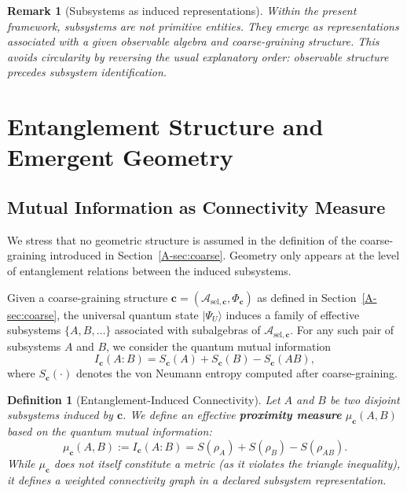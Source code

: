\documentclass[12pt,a4paper,openany]{book}
\newtheorem{definition}[theorem]{Definition}
\newtheorem{remark}[theorem]{Remark}
\begin{document}
\begin{remark}[Subsystems as induced representations]
Within the present framework, subsystems are not primitive entities. 
They emerge as representations associated with a given observable algebra and coarse-graining structure. 
This avoids circularity by reversing the usual explanatory order: observable structure precedes subsystem identification.
\end{remark}

\section{Entanglement Structure and Emergent Geometry}
\label{A-sec:geometry}

\subsection{Mutual Information as Connectivity Measure}

We stress that no geometric structure is assumed in the definition of the coarse-graining introduced in Section~\ref{A-sec:coarse}. 
Geometry only appears at the level of entanglement relations between the induced subsystems.

Given a coarse-graining structure $\mathbf{c} = (\mathcal{A}_{\mathrm{sel},\mathbf c},\Phi_{\mathbf c})$ as defined in Section~\ref{A-sec:coarse}, the universal quantum state $|\Psi_U\rangle$ induces a family of effective subsystems $\{A,B,\dots\}$ associated with subalgebras of $\mathcal{A}_{\mathrm{sel},\mathbf c}$.
For any such pair of subsystems $A$ and $B$, we consider the quantum mutual information
\begin{equation}
I_{\mathbf{c}}(A:B) = S_{\mathbf{c}}(A) + S_{\mathbf{c}}(B) - S_{\mathbf{c}}(AB),
\end{equation}
where $S_{\mathbf{c}}(\cdot)$ denotes the von Neumann entropy computed after coarse-graining.

\begin{definition}[Entanglement-Induced Connectivity]
\label{A-def:connectivity}
Let $A$ and $B$ be two disjoint subsystems induced by $\mathbf{c}$.
We define an effective \textbf{proximity measure} $\mu_{\mathbf{c}}(A,B)$ based on the quantum mutual information:
\begin{equation}
\mu_{\mathbf{c}}(A,B) := I_{\mathbf{c}}(A:B) = S(\rho_A) + S(\rho_B) - S(\rho_{AB}).
\end{equation}
While $\mu_{\mathbf{c}}$ does not itself constitute a metric (as it violates the triangle inequality), it defines a weighted connectivity graph in a declared subsystem representation.
\end{definition}
\end{document}
